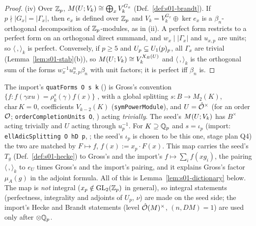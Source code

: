 \begin{proof}
(iv) Over $\mathbb{Z}_p$, $M(U;V_k)\cong\bigoplus_xV_k^{G_x}$ (Def.~\ref{def:s01-brandt}). If $p\nmid|G_x|=|\Gamma_x|$, then $e_x$ is defined over
$\mathbb{Z}_p$ and $V_k=V_k^{G_x}\oplus\ker e_x$ is a $\beta_n$-orthogonal decomposition of $\mathbb{Z}_p$-modules, as in (ii). A perfect form restricts to a
perfect form on an orthogonal direct summand, and $w_x\mid|\Gamma_x|$ and $u_{x,p}$ are units; so $\langle\,,\rangle_k$ is perfect.
Conversely, if $p\ge5$ and $U_p\subseteq U_1(p)_p$, all $\Gamma_x$ are trivial (Lemma~\ref{lem:s01-stab}(b)), so
$M(U;V_k)\cong V_k^{X_B(U)}$ and $\langle\,,\rangle_k$ is the orthogonal sum of the forms $w_x^{-1}u_{x,p}^n\beta_n$ with unit factors;
it is perfect iff $\beta_n$ is.
\end{proof}

\begin{remark}\label{rem:s01-dictionary}
The import's \texttt{quatForms O s k} () is Gross's convention
$\{f:f(\gamma xu)=\rho^s_k(\gamma)f(x)\}$ , with a global
splitting $s:B\to M_2(K)$, $\mathrm{char}\,K=0$, coefficients $V_{k-2}(K)$ (\texttt{symPowerModule}), and $U=\hat{\mathcal{O}}^\times$ (for an
order $\mathcal{O}$; \texttt{orderCompletionUnits O}, ) acting \emph{trivially}. The seed's $M(U;V_k)$ has $B^\times$
acting trivially and $U$ acting through $u_p^{-1}$. For $K\supseteq\mathbb{Q}_p$ and $s=\iota_p$ (import: \texttt{ellAdicSplitting O hD p},
; the seed's $\iota_p$ is chosen to be this one, stage plan Q4) the two are matched by
$F\mapsto f$, $f(x):=x_p\cdot F(x)$. This map carries the seed's $T_g$ (Def.~\ref{def:s01-hecke}) to Gross's and the import's
$f\mapsto\sum_if(xg_i)$, the pairing $\langle\,,\rangle_k$ to $e_U$ times Gross's and the import's pairing, and it explains Gross's factor
$\mu_A(g)$ in the adjoint formula. All of this is Lemma~\ref{lem:s01-dictionary} below. The map is \emph{not} integral
($x_p\notin\mathrm{GL}_2(\mathbb{Z}_p)$ in general), so integral statements (perfectness, integrality and adjoints of $U_p$, $\nu$) are made on the seed side;
the import's Hecke and Brandt statements (level $\hat{\mathcal{O}}(M)^\times$, $(n,DM)=1$) are used only after $\otimes\mathbb{Q}_p$.
\end{remark}

